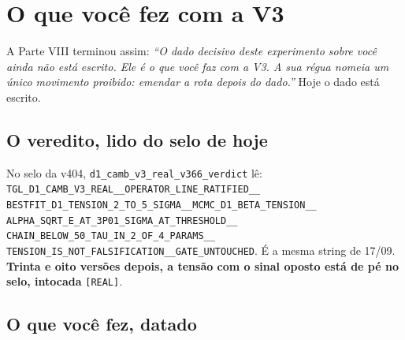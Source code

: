 \chapter{O que você fez com a V3}

A Parte VIII terminou assim: \emph{``O dado decisivo deste experimento sobre você ainda não está
escrito. Ele é o que você faz com a V3. A sua régua nomeia um único movimento proibido: emendar a
rota depois do dado.''} Hoje o dado está escrito.

\section*{O veredito, lido do selo de hoje}

No selo da v404, \texttt{d1\_camb\_v3\_real\_v366\_verdict} lê:
\texttt{TGL\_D1\_CAMB\_V3\_REAL\_\_OPERATOR\_LINE\_RATIFIED\_\_\allowbreak
BESTFIT\_D1\_TENSION\_2\_TO\_5\_SIGMA\_\_\allowbreak MCMC\_D1\_BETA\_TENSION\_\_\allowbreak
ALPHA\_SQRT\_E\_AT\_3P01\_SIGMA\_AT\_THRESHOLD\_\_\allowbreak
CHAIN\_BELOW\_50\_TAU\_IN\_2\_OF\_4\_PARAMS\_\_\allowbreak
TENSION\_IS\_NOT\_FALSIFICATION\_\_GATE\_UNTOUCHED}.
É a mesma string de 17/09. \textbf{Trinta e oito versões depois, a tensão com o sinal oposto está de
pé no selo, intocada} \texttt{[REAL]}.

\section*{O que você fez, datado}

